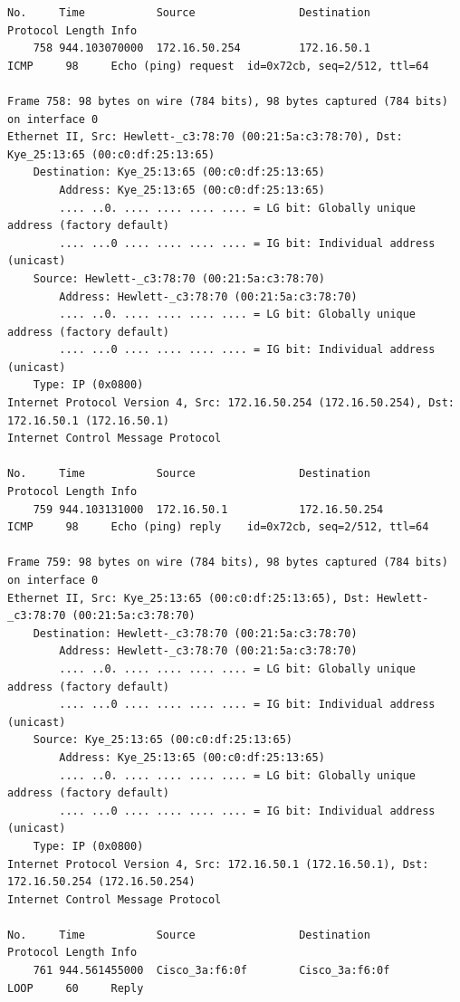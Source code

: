 \documentclass[a4paper,11pt]{article}
\begin{document}
\begin{lstlisting}
No.     Time           Source                Destination           Protocol Length Info
    758 944.103070000  172.16.50.254         172.16.50.1           ICMP     98     Echo (ping) request  id=0x72cb, seq=2/512, ttl=64

Frame 758: 98 bytes on wire (784 bits), 98 bytes captured (784 bits) on interface 0
Ethernet II, Src: Hewlett-_c3:78:70 (00:21:5a:c3:78:70), Dst: Kye_25:13:65 (00:c0:df:25:13:65)
    Destination: Kye_25:13:65 (00:c0:df:25:13:65)
        Address: Kye_25:13:65 (00:c0:df:25:13:65)
        .... ..0. .... .... .... .... = LG bit: Globally unique address (factory default)
        .... ...0 .... .... .... .... = IG bit: Individual address (unicast)
    Source: Hewlett-_c3:78:70 (00:21:5a:c3:78:70)
        Address: Hewlett-_c3:78:70 (00:21:5a:c3:78:70)
        .... ..0. .... .... .... .... = LG bit: Globally unique address (factory default)
        .... ...0 .... .... .... .... = IG bit: Individual address (unicast)
    Type: IP (0x0800)
Internet Protocol Version 4, Src: 172.16.50.254 (172.16.50.254), Dst: 172.16.50.1 (172.16.50.1)
Internet Control Message Protocol

No.     Time           Source                Destination           Protocol Length Info
    759 944.103131000  172.16.50.1           172.16.50.254         ICMP     98     Echo (ping) reply    id=0x72cb, seq=2/512, ttl=64

Frame 759: 98 bytes on wire (784 bits), 98 bytes captured (784 bits) on interface 0
Ethernet II, Src: Kye_25:13:65 (00:c0:df:25:13:65), Dst: Hewlett-_c3:78:70 (00:21:5a:c3:78:70)
    Destination: Hewlett-_c3:78:70 (00:21:5a:c3:78:70)
        Address: Hewlett-_c3:78:70 (00:21:5a:c3:78:70)
        .... ..0. .... .... .... .... = LG bit: Globally unique address (factory default)
        .... ...0 .... .... .... .... = IG bit: Individual address (unicast)
    Source: Kye_25:13:65 (00:c0:df:25:13:65)
        Address: Kye_25:13:65 (00:c0:df:25:13:65)
        .... ..0. .... .... .... .... = LG bit: Globally unique address (factory default)
        .... ...0 .... .... .... .... = IG bit: Individual address (unicast)
    Type: IP (0x0800)
Internet Protocol Version 4, Src: 172.16.50.1 (172.16.50.1), Dst: 172.16.50.254 (172.16.50.254)
Internet Control Message Protocol

No.     Time           Source                Destination           Protocol Length Info
    761 944.561455000  Cisco_3a:f6:0f        Cisco_3a:f6:0f        LOOP     60     Reply


\end{lstlisting}
\end{document}
